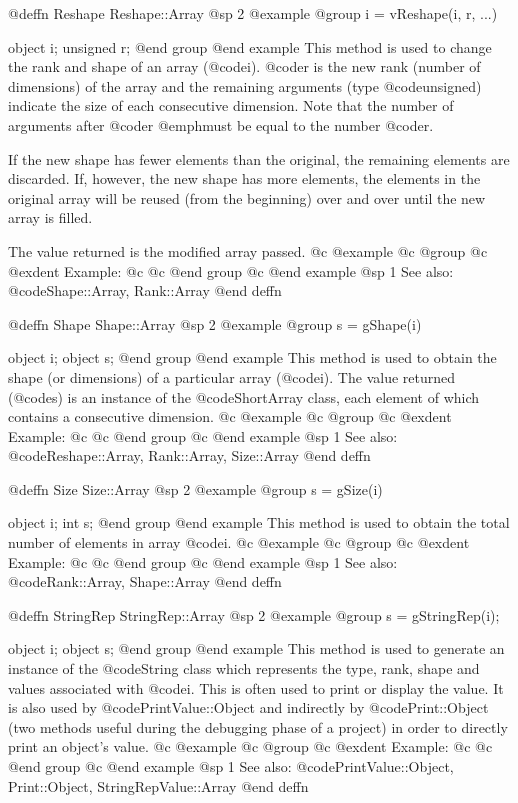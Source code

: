 @deffn {Reshape} Reshape::Array
@sp 2
@example
@group
i = vReshape(i, r, ...)

object     i;
unsigned   r;
@end group
@end example
This method is used to change the rank and shape of an array (@code{i}).
@code{r} is the new rank (number of dimensions) of the array and
the remaining arguments (type @code{unsigned}) indicate the size of
each consecutive dimension.  Note that the number of arguments after
@code{r} @emph{must} be equal to the number @code{r}.

If the new shape has fewer elements than the original, the remaining
elements are discarded.  If, however, the new shape has more elements,
the elements in the original array will be reused (from the beginning)
over and over until the new array is filled.

The value returned is the modified array passed.
@c @example
@c @group
@c @exdent Example:
@c 
@c @end group
@c @end example
@sp 1
See also:  @code{Shape::Array, Rank::Array}
@end deffn







@deffn {Shape} Shape::Array
@sp 2
@example
@group
s = gShape(i)

object  i;
object  s;
@end group
@end example
This method is used to obtain the shape (or dimensions) of a particular
array (@code{i}).  The value returned (@code{s}) is an instance of the
@code{ShortArray} class, each element of which contains a consecutive
dimension.
@c @example
@c @group
@c @exdent Example:
@c 
@c @end group
@c @end example
@sp 1
See also:  @code{Reshape::Array, Rank::Array, Size::Array}
@end deffn








@deffn {Size} Size::Array
@sp 2
@example
@group
s = gSize(i)

object  i;
int     s;
@end group
@end example
This method is used to obtain the total number of elements in array @code{i}.
@c @example
@c @group
@c @exdent Example:
@c 
@c @end group
@c @end example
@sp 1
See also:  @code{Rank::Array, Shape::Array}
@end deffn







@deffn {StringRep} StringRep::Array
@sp 2
@example
@group
s = gStringRep(i);

object  i;
object  s;
@end group
@end example
This method is used to generate an instance of the @code{String} class
which represents the type, rank, shape and values associated with
@code{i}.  This is often used to print or display the value.  It is also
used by @code{PrintValue::Object} and indirectly by @code{Print::Object}
(two methods useful during the debugging phase of a project) in order to
directly print an object's value.
@c @example
@c @group
@c @exdent Example:
@c 
@c @end group
@c @end example
@sp 1
See also:  @code{PrintValue::Object, Print::Object, StringRepValue::Array}
@end deffn







